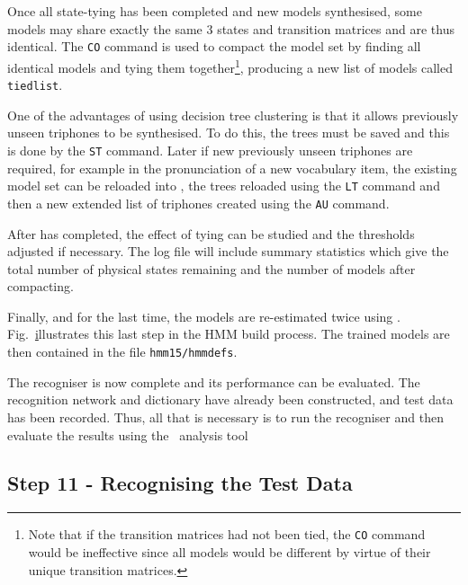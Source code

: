 Once all state-tying has been completed and new models synthesised, 
some models may  share exactly
the same 3 states and transition matrices and are thus identical.
The \texttt{CO} command is used
to compact the model set by finding all identical models and tying them
together\footnote{
Note that if the transition matrices had not been tied, the \texttt{CO}
command would be ineffective since all models would be different by
virtue of their unique transition matrices.}, producing a new list of models
called \texttt{tiedlist}.

One of the advantages of using decision tree clustering is that it allows
previously
unseen triphones to be synthesised.  To do this, the trees must
be saved and this is done by the \texttt{ST} command.
Later if new previously unseen triphones are required, for example in the
pronunciation of a new vocabulary item, the existing model set can be
reloaded into , the trees reloaded using 
the \texttt{LT} command
and then a new extended list of triphones created using 
the \texttt{AU} command.

After  has completed,  the effect of tying can be studied and
the thresholds adjusted if necessary.  The log file will
include summary statistics which give the total number of physical
states remaining and the number of models after compacting.

Finally, and for the last time, the models are re-estimated twice using
.  Fig.~\href{f:step10} illustrates this last step in the HMM
build process.  The trained models are then contained in the file
\texttt{hmm15/hmmdefs}.


The recogniser is now complete and its performance can be evaluated.  
The recognition network and dictionary have already been constructed, 
and test data has been recorded.  
Thus, all that is necessary is to run the recogniser and 
then evaluate the results using the \HTK\ analysis tool 

\subsection{Step 11 - Recognising the Test Data}

